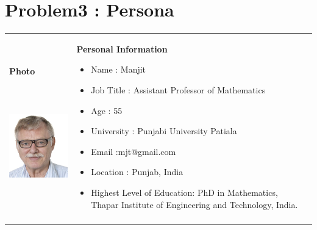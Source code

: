 \documentclass[12pt]{article}
\begin{document}
\section{Problem3 : Persona}
\begin{table}[H]
 			\centering
\begin{tabular}{p{1.65in}p{4.45in}}
\hline
\multicolumn{1}{|p{1.65in}}{{\fontsize{10pt}{12.0pt}\selectfont \textbf{Photo}} \par {\fontsize{10pt}{12.0pt}\selectfont \textbf{\ \ \ \ \   }} \par 
	\begin{Center}
		\includegraphics[width=1.65in,height=1.36in]{./manjit.png}
	\end{Center}
} & 
\multicolumn{1}{|p{4.45in}|}{{\fontsize{10pt}{12.0pt}\selectfont \textbf{Personal Information}} \par \begin{itemize}
	\item {\fontsize{10pt}{12.0pt}\selectfont Name : Manjit} \par 	\item {\fontsize{10pt}{12.0pt}\selectfont Job Title : Assistant Professor of Mathematics} \par 	\item {\fontsize{10pt}{12.0pt}\selectfont Age : 55} \par 	\item {\fontsize{10pt}{12.0pt}\selectfont University : Punjabi University Patiala} \par 	\item {\fontsize{10pt}{12.0pt}\selectfont Email :mjt@gmail.com} \par 	\item {\fontsize{10pt}{12.0pt}\selectfont Location : Punjab, India} \par 	\item {\fontsize{10pt}{12.0pt}\selectfont Highest Level of Education: PhD in Mathematics, Thapar Institute of Engineering and Technology, India.}
\end{itemize} \par } \\
\hhline{--}

\end{tabular}
\end{table}
\end{document}
